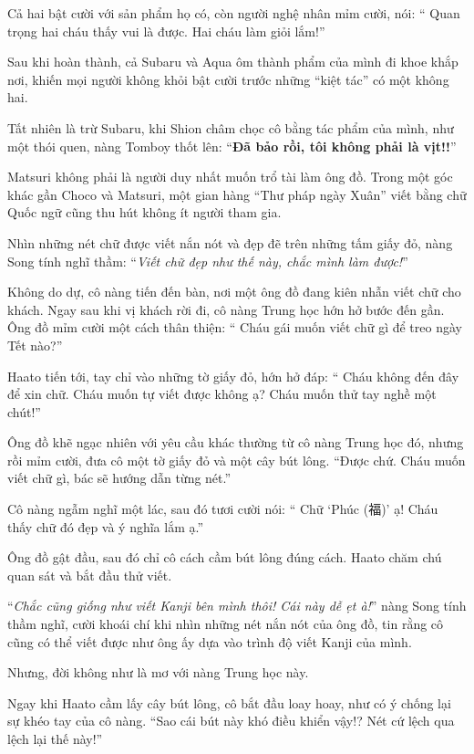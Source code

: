 \documentclass[../main.tex]{subfiles}
\begin{document}
Cả hai bật cười với sản phẩm họ có, còn người nghệ nhân mỉm cười, nói: ``{\color{red} Quan trọng hai cháu thấy vui là được. Hai cháu làm giỏi lắm!}''

Sau khi hoàn thành, cả Subaru và Aqua ôm thành phẩm của mình đi khoe khắp nơi, khiến mọi người không khỏi bật cười trước những ``kiệt tác'' có một không hai.

Tất nhiên là trừ Subaru, khi Shion châm chọc cô bằng tác phẩm của mình, như một thói quen, nàng Tomboy thốt lên: ``\textbf{Đã bảo rồi, tôi không phải là vịt!!}''

\ct

Matsuri không phải là người duy nhất muốn trổ tài làm ông đồ. Trong một góc khác gần Choco và Matsuri, một gian hàng ``Thư pháp ngày Xuân'' viết bằng chữ Quốc ngữ cũng thu hút không ít người tham gia.

Nhìn những nét chữ được viết nắn nót và đẹp đẽ trên những tấm giấy đỏ, nàng Song tính nghĩ thầm: ``\textit{Viết chữ đẹp như thế này, chắc mình làm được!}''

Không do dự, cô nàng tiến đến bàn, nơi một ông đồ đang kiên nhẫn viết chữ cho khách. Ngay sau khi vị khách rời đi, cô nàng Trung học hớn hở bước đến gần. Ông đồ mỉm cười một cách thân thiện: ``{\color{red} Cháu gái muốn viết chữ gì để treo ngày Tết nào?}''

Haato tiến tới, tay chỉ vào những tờ giấy đỏ, hớn hở đáp: ``{\color{red} Cháu không đến đây để xin chữ. Cháu muốn tự viết được không ạ? Cháu muốn thử tay nghề một chút!}''

Ông đồ khẽ ngạc nhiên với yêu cầu khác thường từ cô nàng Trung học đó, nhưng rồi mỉm cười, đưa cô một tờ giấy đỏ và một cây bút lông. ``Được chứ. Cháu muốn viết chữ gì, bác sẽ hướng dẫn từng nét.''

Cô nàng ngẫm nghĩ một lác, sau đó tươi cười nói: ``{\color{red} Chữ `Phúc (福)' ạ! Cháu thấy chữ đó đẹp và ý nghĩa lắm ạ.}''

Ông đồ gật đầu, sau đó chỉ cô cách cầm bút lông đúng cách. Haato chăm chú quan sát và bắt đầu thử viết.

``\textit{Chắc cũng giống như viết Kanji bên mình thôi! Cái này dễ ẹt à!}'' nàng Song tính thầm nghĩ, cười khoái chí khi nhìn những nét nắn nót của ông đồ, tin rằng cô cũng có thể viết được như ông ấy dựa vào trình độ viết Kanji của mình.

Nhưng, đời không như là mơ với nàng Trung học này.

Ngay khi Haato cầm lấy cây bút lông, cô bắt đầu loay hoay, như có ý chống lại sự khéo tay của cô nàng. ``Sao cái bút này khó điều khiển vậy!? Nét cứ lệch qua lệch lại thế này!''
\end{document}
